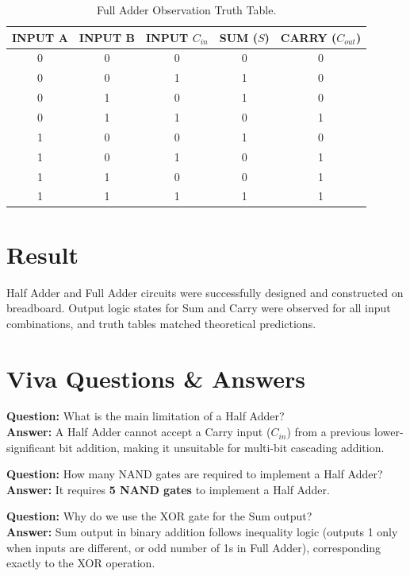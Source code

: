 \begin{table}[htbp]
\centering
\small
\begin{tabularx}{0.85\textwidth}{c c c c c}
\toprule
\textbf{INPUT A} & \textbf{INPUT B} & \textbf{INPUT $C_{in}$} & \textbf{SUM ($S$)} & \textbf{CARRY ($C_{out}$)} \\
\midrule
0 & 0 & 0 & 0 & 0 \\
0 & 0 & 1 & 1 & 0 \\
0 & 1 & 0 & 1 & 0 \\
0 & 1 & 1 & 0 & 1 \\
1 & 0 & 0 & 1 & 0 \\
1 & 0 & 1 & 0 & 1 \\
1 & 1 & 0 & 0 & 1 \\
1 & 1 & 1 & 1 & 1 \\
\bottomrule
\end{tabularx}
\caption{Full Adder Observation Truth Table.}
\label{tab:full-adder-tt}
\end{table}

\section{Result}
Half Adder and Full Adder circuits were successfully designed and constructed on breadboard. Output logic states for Sum and Carry were observed for all input combinations, and truth tables matched theoretical predictions.

\section{Viva Questions \& Answers}

\begin{vivaqa}
\textbf{Question:} What is the main limitation of a Half Adder?\\[4pt]
\textbf{Answer:} A Half Adder cannot accept a Carry input ($C_{in}$) from a previous lower-significant bit addition, making it unsuitable for multi-bit cascading addition.
\end{vivaqa}

\begin{vivaqa}
\textbf{Question:} How many NAND gates are required to implement a Half Adder?\\[4pt]
\textbf{Answer:} It requires \textbf{5 NAND gates} to implement a Half Adder.
\end{vivaqa}

\begin{vivaqa}
\textbf{Question:} Why do we use the XOR gate for the Sum output?\\[4pt]
\textbf{Answer:} Sum output in binary addition follows inequality logic (outputs 1 only when inputs are different, or odd number of 1s in Full Adder), corresponding exactly to the XOR operation.
\end{vivaqa}

